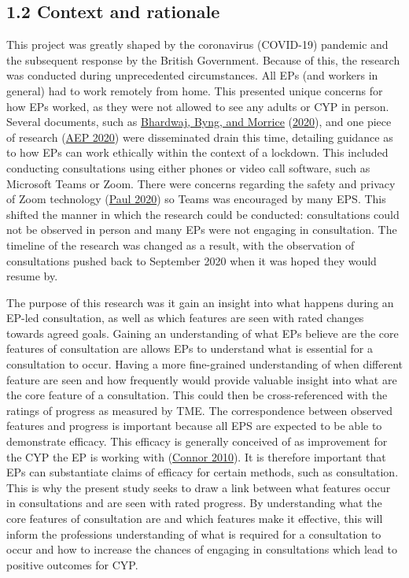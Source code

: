 \documentclass[
]{article}
\begin{document}
\hypertarget{context-and-rationale}{%
\subsection{1.2 Context and rationale}\label{context-and-rationale}}

This project was greatly shaped by the coronavirus (COVID-19) pandemic
and the subsequent response by the British Government. Because of this,
the research was conducted during unprecedented circumstances. All EPs
(and workers in general) had to work remotely from home. This presented
unique concerns for how EPs worked, as they were not allowed to see any
adults or CYP in person. Several documents, such as
\protect\hyperlink{ref-bhardwajRapidLiteratureReview2020}{Bhardwaj,
Byng, and Morrice}
(\protect\hyperlink{ref-bhardwajRapidLiteratureReview2020}{2020}), and
one piece of research
(\protect\hyperlink{ref-aepSurveyEffectsCovid192020}{AEP 2020}) were
disseminated drain this time, detailing guidance as to how EPs can work
ethically within the context of a lockdown. This included conducting
consultations using either phones or video call software, such as
Microsoft Teams or Zoom. There were concerns regarding the safety and
privacy of Zoom technology
(\protect\hyperlink{ref-paulZoomMalwareWhy2020}{Paul 2020}) so Teams was
encouraged by many EPS. This shifted the manner in which the research
could be conducted: consultations could not be observed in person and
many EPs were not engaging in consultation. The timeline of the research
was changed as a result, with the observation of consultations pushed
back to September 2020 when it was hoped they would resume by.

The purpose of this research was it gain an insight into what happens
during an EP-led consultation, as well as which features are seen with
rated changes towards agreed goals. Gaining an understanding of what EPs
believe are the core features of consultation are allows EPs to
understand what is essential for a consultation to occur. Having a more
fine-grained understanding of when different feature are seen and how
frequently would provide valuable insight into what are the core feature
of a consultation. This could then be cross-referenced with the ratings
of progress as measured by TME. The correspondence between observed
features and progress is important because all EPS are expected to be
able to demonstrate efficacy. This efficacy is generally conceived of as
improvement for the CYP the EP is working with
(\protect\hyperlink{ref-connorTargetMonitoringEvaluation2010}{Connor
2010}). It is therefore important that EPs can substantiate claims of
efficacy for certain methods, such as consultation. This is why the
present study seeks to draw a link between what features occur in
consultations and are seen with rated progress. By understanding what
the core features of consultation are and which features make it
effective, this will inform the professions understanding of what is
required for a consultation to occur and how to increase the chances of
engaging in consultations which lead to positive outcomes for CYP.
\end{document}

